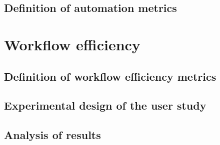 \subsection{Definition of automation metrics}

\section{Workflow efficiency}
\noindent{}

\subsection{Definition of workflow efficiency metrics}
\subsection{Experimental design of the user study}
\subsection{Analysis of results}

